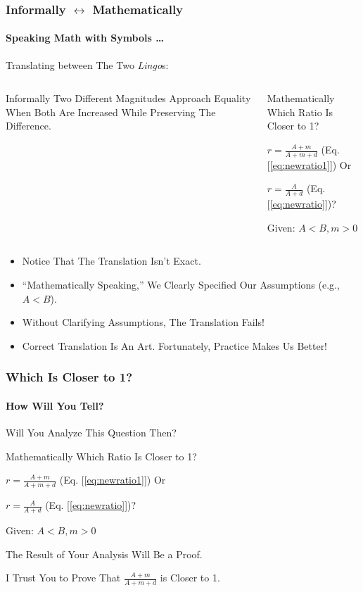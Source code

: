 \documentclass{beamer}
\begin{document}
\begin{frame}
\frametitle{Informally $\leftrightarrow$ Mathematically}
\framesubtitle{Speaking Math with Symbols \dots}
\label{slide:informalmathematical}
Translating between The Two \textit{Lingo}s:

\begin{columns}[t]
\begin{block}{Informally}
Two Different Magnitudes \alert{Approach Equality} When Both Are Increased While Preserving The Difference.
\end{block}
\pause
{}
\begin{block}{Mathematically}
Which \alert{Ratio Is Closer to 1}? 

$r=\frac{A+m}{A+m+d}$ (Eq. [\ref{eq:newratio1}]) Or 

$r=\frac{A}{A+d}$ (Eq. [\ref{eq:newratio}])?

Given: $A<B, m>0$
\end{block}
\end{columns}
\begin{itemize}
\pause
\item Notice That The Translation \alert{Isn't Exact}.
\pause
\item ``Mathematically Speaking,'' We Clearly Specified Our Assumptions (\alert{e.g., $A<B$}).
\pause
\item Without Clarifying Assumptions, The Translation Fails!
\pause
\item Correct Translation Is An Art. Fortunately, Practice Makes Us Better!
\end{itemize}
\end{frame}

\begin{frame}
\frametitle{Which Is Closer to 1?}
\framesubtitle{How Will You Tell?}
\label{slide:whichiscloserto1}
Will You Analyze This Question Then?
\pause
\begin{block}{Mathematically}
Which \alert{Ratio Is Closer to 1}? 

$r=\frac{A+m}{A+m+d}$ (Eq. [\ref{eq:newratio1}]) Or 

$r=\frac{A}{A+d}$ (Eq. [\ref{eq:newratio}])?

Given: $A<B, m>0$
\end{block}
\pause
The Result of Your Analysis Will Be a \alert{Proof}.

\pause
\alert{I Trust You to Prove That $\frac{A+m}{A+m+d}$ is Closer to 1.}
\end{frame}
\end{document}
